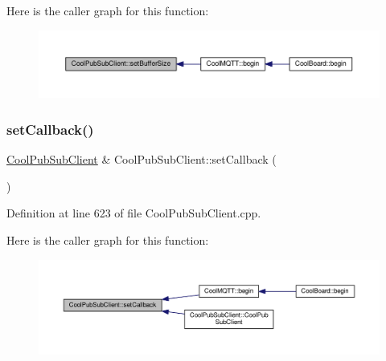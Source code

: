 Here is the caller graph for this function\+:
\nopagebreak
\begin{figure}[H]
\begin{center}
\leavevmode
\includegraphics[width=350pt]{class_cool_pub_sub_client_a4f83e54f1ba96e32f725d93cdec283b7_icgraph}
\end{center}
\end{figure}
\mbox{\label{class_cool_pub_sub_client_ac5cab7658f1bdded32131241e468e661}} 
\subsubsection{\texorpdfstring{set\+Callback()}{setCallback()}}
{\footnotesize\ttfamily \hyperlink{class_cool_pub_sub_client}{Cool\+Pub\+Sub\+Client} \& Cool\+Pub\+Sub\+Client\+::set\+Callback (\begin{DoxyParamCaption}\item[{\hyperlink{class_cool_pub_sub_client_a021ec75e9fbaf658370b8005ccfddc14}{M\+Q\+T\+T\+\_\+\+C\+A\+L\+L\+B\+A\+C\+K\+\_\+\+S\+I\+G\+N\+A\+T\+U\+RE}}]{ }\end{DoxyParamCaption})}



Definition at line 623 of file Cool\+Pub\+Sub\+Client.\+cpp.

Here is the caller graph for this function\+:
\nopagebreak
\begin{figure}[H]
\begin{center}
\leavevmode
\includegraphics[width=350pt]{class_cool_pub_sub_client_ac5cab7658f1bdded32131241e468e661_icgraph}
\end{center}
\end{figure}
\mbox{\label{class_cool_pub_sub_client_a7ee119b786010561ab6a9afa0798e91d}} 
